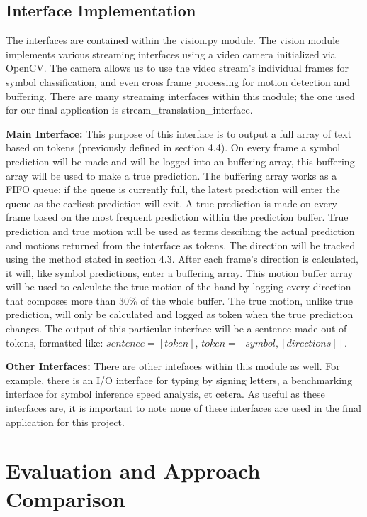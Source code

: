 \documentclass[11pt]{article}
\def\paraskip{\vskip 0.4cm}
\begin{document}
    \subsection{Interface Implementation}
    The interfaces are contained within the vision.py module. The vision module implements various streaming interfaces using a video camera initialized via OpenCV. The camera allows us to use the video stream's individual frames for symbol classification, and even cross frame processing for motion detection and buffering. There are many streaming interfaces within this module; the one used for our final application is stream\_translation\_interface. 

    \paraskip
    \noindent\textbf{Main Interface: } This purpose of this interface is to output a full array of text based on tokens (previously defined in section 4.4). On every frame a symbol prediction will be made and will be logged into an buffering array, this buffering array will be used to make a true prediction. The buffering array works as a FIFO queue; if the queue is currently full, the latest prediction will enter the queue as the earliest prediction will exit. A true prediction is made on every frame based on the most frequent prediction within the prediction buffer. True prediction and true motion will be used as terms descibing the actual prediction and motions returned from the interface as tokens. The direction will be tracked using the method stated in section 4.3. After each frame's direction is calculated, it will, like symbol predictions, enter a buffering array. This motion buffer array will be used to calculate the true motion of the hand by logging every direction that composes more than 30\% of the whole buffer. The true motion, unlike true prediction, will only be calculated and logged as token when the true prediction changes. The output of this particular interface will be a sentence made out of tokens, formatted like: $sentence = [token]$, $token = [symbol, [directions]]$.

    \paraskip
    \noindent\textbf{Other Interfaces: } There are other intefaces within this module as well. For example, there is an I/O interface for typing by signing letters, a benchmarking interface for symbol inference speed analysis, et cetera. As useful as these interfaces are, it is important to note none of these interfaces are used in the final application for this project.


\section{Evaluation and Approach Comparison}
\end{document}
